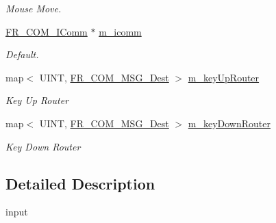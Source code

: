 \begin{DoxyCompactItemize}
\begin{DoxyCompactList}\small\item\em Mouse Move. \item\end{DoxyCompactList}\item 
\hypertarget{classPlatform_1_1Input_1_1Input_a5682edc61a54b8f2e5394fb3252bcd90}{
\hyperlink{classFramework_1_1Communication_1_1IComm}{FR\_\-COM\_\-IComm} $\ast$ \hyperlink{classPlatform_1_1Input_1_1Input_a5682edc61a54b8f2e5394fb3252bcd90}{m\_\-icomm}}
\label{classPlatform_1_1Input_1_1Input_a5682edc61a54b8f2e5394fb3252bcd90}

\begin{DoxyCompactList}\small\item\em Default. \item\end{DoxyCompactList}\item 
\hypertarget{classPlatform_1_1Input_1_1Input_a132d2b635dfe1cc7077e7f46cd8baa9d}{
map$<$ UINT, \hyperlink{structFramework_1_1Communication_1_1Message_1_1Dest}{FR\_\-COM\_\-MSG\_\-Dest} $>$ \hyperlink{classPlatform_1_1Input_1_1Input_a132d2b635dfe1cc7077e7f46cd8baa9d}{m\_\-keyUpRouter}}
\label{classPlatform_1_1Input_1_1Input_a132d2b635dfe1cc7077e7f46cd8baa9d}

\begin{DoxyCompactList}\small\item\em Key Up Router \item\end{DoxyCompactList}\item 
\hypertarget{classPlatform_1_1Input_1_1Input_a544ee53291c8ca29bbe88534f208ba56}{
map$<$ UINT, \hyperlink{structFramework_1_1Communication_1_1Message_1_1Dest}{FR\_\-COM\_\-MSG\_\-Dest} $>$ \hyperlink{classPlatform_1_1Input_1_1Input_a544ee53291c8ca29bbe88534f208ba56}{m\_\-keyDownRouter}}
\label{classPlatform_1_1Input_1_1Input_a544ee53291c8ca29bbe88534f208ba56}

\begin{DoxyCompactList}\small\item\em Key Down Router \item\end{DoxyCompactList}\end{DoxyCompactItemize}


\subsection{Detailed Description}
input 

